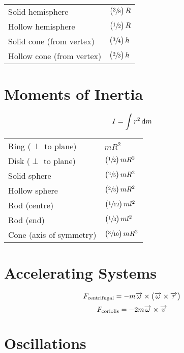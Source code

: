 \documentclass[fleqn, a5paper]{amsart}
\theoremstyle{definition}
\theoremstyle{theorem}
\begin{document}
\begin{tabular}{l l}
	Solid hemisphere & $\left( \sfrac{3}{8} \right) R$\\
	Hollow hemisphere & $\left( \sfrac{1}{2} \right) R$\\
	Solid cone (from vertex) & $\left( \sfrac{3}{4} \right) h$\\
	Hollow cone (from vertex) & $\left( \sfrac{2}{3} \right) h$\\
\end{tabular}

\section{Moments of Inertia}

\begin{equation*}
	I = \int r^2 \dif m
\end{equation*}

\begin{tabular}{l l}
	Ring ($\perp$ to plane) & $m R^2$\\
	Disk ($\perp$ to plane) & $\left( \sfrac{1}{2} \right) m R^2$\\
	Solid sphere & $\left( \sfrac{2}{5} \right) m R^2$\\
	Hollow sphere & $\left( \sfrac{2}{3} \right) m R^2$\\
	Rod (centre) & $\left( \sfrac{1}{12} \right) m l^2$\\
	Rod (end) & $\left( \sfrac{1}{3} \right) m l^2$\\
	Cone (axis of symmetry) & $\left( \sfrac{3}{10} \right) m R^2$\\
\end{tabular}

\section{Accelerating Systems}

\begin{equation*}
	F_{\textnormal{centrifugal}} = - m \overrightarrow{\omega} \times \left( \overrightarrow{\omega} \times \overrightarrow{r} \right)
\end{equation*}
\begin{equation*}
	F_{\textnormal{coriolis}} = - 2 m \overrightarrow{\omega} \times \overrightarrow{v}
\end{equation*}

\section{Oscillations}
\end{document}
